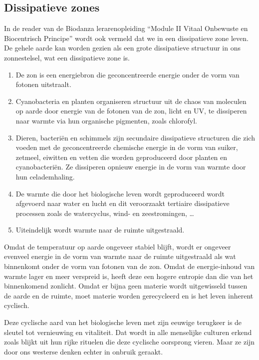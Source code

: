 \documentclass[
  11pt,
]{book}
\begin{document}
\subsection{Dissipatieve zones}\label{dissipatieve-zones}

In de reader van de Biodanza lerarenopleiding ``Module II Vitaal Onbewuste en Biocentrisch Principe'' wordt ook vermeld dat we in een dissipatieve zone leven. De gehele aarde kan worden gezien als een grote dissipatieve structuur in ons zonnestelsel, wat een dissipatieve zone is.

\begin{enumerate}
\def\labelenumi{\arabic{enumi}.}
\item
  De zon is een energiebron die geconcentreerde energie onder de vorm van fotonen uitstraalt.
\item
  Cyanobacteria en planten organiseren structuur uit de chaos van moleculen op aarde door energie van de fotonen van de zon, licht en UV, te dissiperen naar warmte via hun organische pigmenten, zoals chlorofyl.
\item
  Dieren, bacteriën en schimmels zijn secundaire dissipatieve structuren die zich voeden met de geconcentreerde chemische energie in de vorm van suiker, zetmeel, eiwitten en vetten die worden geproduceerd door planten en cyanobacteriën. Ze dissiperen opnieuw energie in de vorm van warmte door hun celademhaling.
\item
  De warmte die door het biologische leven wordt geproduceerd wordt afgevoerd naar water en lucht en dit veroorzaakt tertiaire dissipatieve processen zoals de watercyclus, wind- en zeestromingen, \ldots{}
\item
  Uiteindelijk wordt warmte naar de ruimte uitgestraald.
\end{enumerate}

Omdat de temperatuur op aarde ongeveer stabiel blijft, wordt er ongeveer evenveel energie in de vorm van warmte naar de ruimte uitgestraald als wat binnenkomt onder de vorm van fotonen van de zon. Omdat de energie-inhoud van warmte lager en meer verspreid is, heeft deze een hogere entropie dan die van het binnenkomend zonlicht. Omdat er bijna geen materie wordt uitgewisseld tussen de aarde en de ruimte, moet materie worden gerecycleerd en is het leven inherent cyclisch.

Deze cyclische aard van het biologische leven met zijn eeuwige terugkeer is de sleutel tot vernieuwing en vitaliteit. Dat wordt in alle menselijke culturen erkend zoals blijkt uit hun rijke rituelen die deze cyclische oorsprong vieren. Maar ze zijn door ons westerse denken echter in onbruik geraakt.
\end{document}

